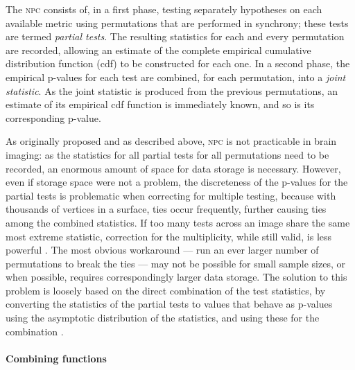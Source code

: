 The \textsc{npc} consists of, in a first phase, testing separately hypotheses on each available metric using permutations that are performed in synchrony; these tests are termed \emph{partial tests}. The resulting statistics for each and every permutation are recorded, allowing an estimate of the complete empirical cumulative distribution function (cdf) to be constructed for each one. In a second phase, the empirical p-values for each test are combined, for each permutation, into a \emph{joint statistic}. As the joint statistic is produced from the previous permutations, an estimate of its empirical cdf function is immediately known, and so is its corresponding p-value.

As originally proposed and as described above, \textsc{npc} is not practicable in brain imaging: as the statistics for all partial tests for all permutations need to be recorded, an enormous amount of space for data storage is necessary. However, even if storage space were not a problem, the discreteness of the p-values for the partial tests is problematic when correcting for multiple testing, because with thousands of vertices in a surface, ties occur frequently, further causing ties among the combined statistics. If too many tests across an image share the same most extreme statistic, correction for the multiplicity, while still valid, is less powerful \citep{Westfall1993, Pantazis2005}. The most obvious workaround --- run an ever larger number of permutations to break the ties --- may not be possible for small sample sizes, or when possible, requires correspondingly larger data storage. The solution to this problem is loosely based on the direct combination of the test statistics, by converting the statistics of the partial tests to values that behave as p-values using the asymptotic distribution of the statistics, and using these for the combination \citep{Winkler2016_npc}.

\paragraph{Combining functions}

